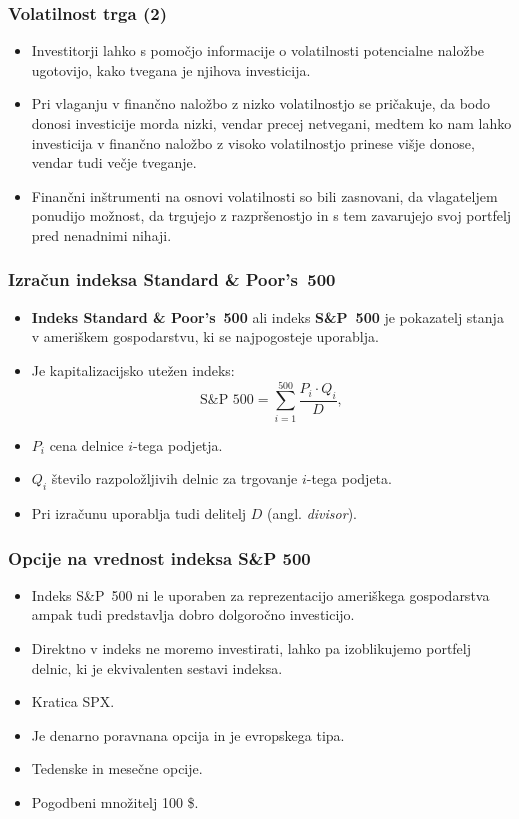 \documentclass[10pt]{beamer}
\begin{document}
\begin{frame}
\frametitle{Volatilnost trga (2)}
\begin{itemize}
\item Investitorji lahko s pomočjo informacije o volatilnosti potencialne naložbe ugotovijo, kako tvegana je njihova investicija.
\item  Pri vlaganju v finančno naložbo z nizko volatilnostjo se pričakuje, da bodo donosi investicije morda nizki, vendar precej netvegani, medtem ko nam lahko investicija v finančno naložbo z visoko volatilnostjo prinese višje donose, vendar tudi večje tveganje.
\item Finančni inštrumenti na osnovi volatilnosti so bili zasnovani, da vlagateljem ponudijo možnost, da trgujejo z razpršenostjo in s tem zavarujejo svoj portfelj pred nenadnimi nihaji.
\end{itemize}

\end{frame}

\begin{frame}
\frametitle{Izračun indeksa Standard \& Poor’s~500}
\begin{itemize}
\item \textbf{Indeks Standard \& Poor's~500} ali indeks \textbf{S\&P~500} je pokazatelj stanja v ameriškem gospodarstvu, ki se najpogosteje uporablja.
\item Je kapitalizacijsko utežen indeks: 
$$
\text{S\&P~500} = \sum_{i=1}^{500}\frac{P_i \cdot{} Q_i}{D},
$$
\item  \textbf{$P_i$} cena delnice $i$-tega podjetja.
\item  \textbf{$Q_i$} število razpoložljivih delnic za trgovanje $i$-tega podjeta.
\item  Pri izračunu uporablja tudi delitelj $D$ (angl. \textit{divisor}).

\end{itemize}
\end{frame}

\begin{frame}
\frametitle{Opcije na vrednost indeksa S\&P 500}
\begin{itemize}
\item Indeks S\&P~500 ni le uporaben za reprezentacijo ameriškega gospodarstva ampak tudi predstavlja dobro dolgoročno investicijo.
\item Direktno v indeks ne moremo investirati, lahko pa izoblikujemo portfelj delnic, ki je ekvivalenten sestavi indeksa.
\item Kratica SPX.
\item Je denarno poravnana opcija in je evropskega tipa.
\item Tedenske in mesečne opcije.
\item Pogodbeni množitelj 100 \$.
\end{itemize}

\end{frame}
\end{document}
